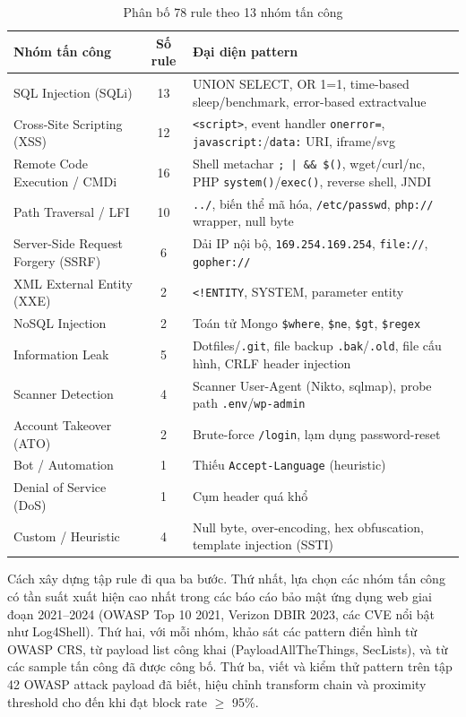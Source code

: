 \documentclass[../DoAn.tex]{subfiles}
\begin{document}
\begin{table}[h!]
\centering
\caption{Phân bố 78 rule theo 13 nhóm tấn công}
\label{table:rule-groups}
\small
\begin{tabular}{|l|c|p{6.5cm}|}
\hline
\textbf{Nhóm tấn công} & \textbf{Số rule} & \textbf{Đại diện pattern} \\
\hline
SQL Injection (SQLi) & 13 & UNION SELECT, OR 1=1, time-based sleep/benchmark, error-based extractvalue \\
\hline
Cross-Site Scripting (XSS) & 12 & \texttt{<script>}, event handler \texttt{onerror=}, \texttt{javascript:}/\texttt{data:} URI, iframe/svg \\
\hline
Remote Code Execution / CMDi & 16 & Shell metachar \texttt{; | \&\& \$()}, wget/curl/nc, PHP \texttt{system()}/\texttt{exec()}, reverse shell, JNDI \\
\hline
Path Traversal / LFI & 10 & \texttt{../}, biến thể mã hóa, \texttt{/etc/passwd}, \texttt{php://} wrapper, null byte \\
\hline
Server-Side Request Forgery (SSRF) & 6 & Dải IP nội bộ, \texttt{169.254.169.254}, \texttt{file://}, \texttt{gopher://} \\
\hline
XML External Entity (XXE) & 2 & \texttt{<!ENTITY}, SYSTEM, parameter entity \\
\hline
NoSQL Injection & 2 & Toán tử Mongo \texttt{\$where}, \texttt{\$ne}, \texttt{\$gt}, \texttt{\$regex} \\
\hline
Information Leak & 5 & Dotfiles/\texttt{.git}, file backup \texttt{.bak}/\texttt{.old}, file cấu hình, CRLF header injection \\
\hline
Scanner Detection & 4 & Scanner User-Agent (Nikto, sqlmap), probe path \texttt{.env}/\texttt{wp-admin} \\
\hline
Account Takeover (ATO) & 2 & Brute-force \texttt{/login}, lạm dụng password-reset \\
\hline
Bot / Automation & 1 & Thiếu \texttt{Accept-Language} (heuristic) \\
\hline
Denial of Service (DoS) & 1 & Cụm header quá khổ \\
\hline
Custom / Heuristic & 4 & Null byte, over-encoding, hex obfuscation, template injection (SSTI) \\
\hline
\end{tabular}
\end{table}

Cách xây dựng tập rule đi qua ba bước. Thứ nhất, lựa chọn các nhóm tấn
công có tần suất xuất hiện cao nhất trong các báo cáo bảo mật ứng dụng web
giai đoạn 2021--2024 (OWASP Top 10 2021, Verizon DBIR 2023, các CVE nổi
bật như Log4Shell). Thứ hai, với mỗi nhóm, khảo sát các pattern điển hình
từ OWASP CRS, từ payload list công khai (PayloadAllTheThings, SecLists),
và từ các sample tấn công đã được công bố. Thứ ba, viết và kiểm thử pattern
trên tập 42 OWASP attack payload đã biết, hiệu chỉnh transform chain và
proximity threshold cho đến khi đạt block rate \(\ge\) 95\%.
\end{document}
